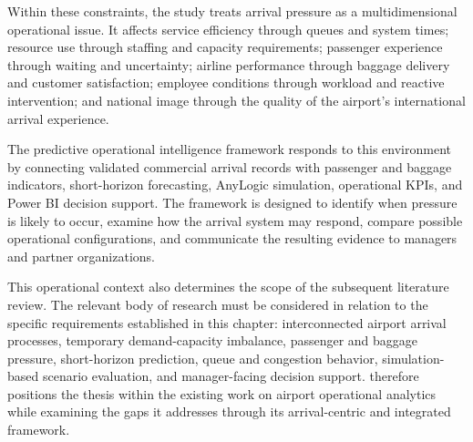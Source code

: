 Within these constraints, the study treats arrival pressure as a multidimensional operational issue. It affects service efficiency through queues and system times; resource use through staffing and capacity requirements; passenger experience through waiting and uncertainty; airline performance through baggage delivery and customer satisfaction; employee conditions through workload and reactive intervention; and national image through the quality of the airport's international arrival experience.

The predictive operational intelligence framework responds to this environment by connecting validated commercial arrival records with passenger and baggage indicators, short-horizon forecasting, AnyLogic simulation, operational KPIs, and Power BI decision support. The framework is designed to identify when pressure is likely to occur, examine how the arrival system may respond, compare possible operational configurations, and communicate the resulting evidence to managers and partner organizations.

This operational context also determines the scope of the subsequent literature review. The relevant body of research must be considered in relation to the specific requirements established in this chapter: interconnected airport arrival processes, temporary demand-capacity imbalance, passenger and baggage pressure, short-horizon prediction, queue and congestion behavior, simulation-based scenario evaluation, and manager-facing decision support.  therefore positions the thesis within the existing work on airport operational analytics while examining the gaps it addresses through its arrival-centric and integrated framework.